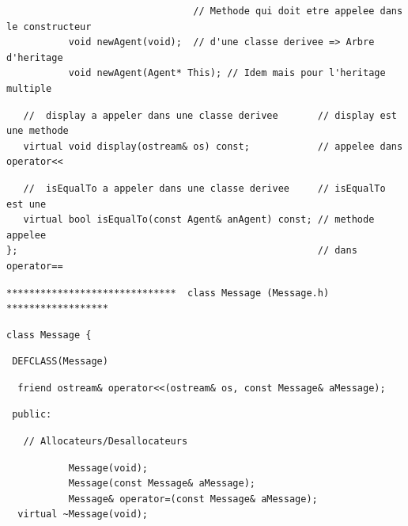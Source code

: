 \documentclass[12pt]{article}
\begin{document}
\begin{footnotesize}
\begin{verbatim}
\end{verbatim}
\vspace{-0.5cm}
\begin{verbatim}
                                 // Methode qui doit etre appelee dans le constructeur
           void newAgent(void);  // d'une classe derivee => Arbre d'heritage
           void newAgent(Agent* This); // Idem mais pour l'heritage multiple
\end{verbatim}
\vspace{-0.5cm}
\begin{verbatim}
   //  display a appeler dans une classe derivee       // display est une methode
   virtual void display(ostream& os) const;            // appelee dans operator<<
\end{verbatim}
\vspace{-0.5cm}
\begin{verbatim}
   //  isEqualTo a appeler dans une classe derivee     // isEqualTo est une
   virtual bool isEqualTo(const Agent& anAgent) const; // methode appelee
};                                                     // dans operator==
\end{verbatim}
\newpage
\begin{verbatim}
******************************  class Message (Message.h) ******************
\end{verbatim}
\begin{verbatim}
class Message {
\end{verbatim}
\begin{verbatim}
 DEFCLASS(Message)
\end{verbatim}
\begin{verbatim}
  friend ostream& operator<<(ostream& os, const Message& aMessage);
\end{verbatim}
\begin{verbatim}
 public:
\end{verbatim}
\begin{verbatim}
   // Allocateurs/Desallocateurs
\end{verbatim}
\begin{verbatim}
           Message(void);
           Message(const Message& aMessage);
           Message& operator=(const Message& aMessage);
  virtual ~Message(void);


\end{verbatim}
\end{footnotesize}
\end{document}
